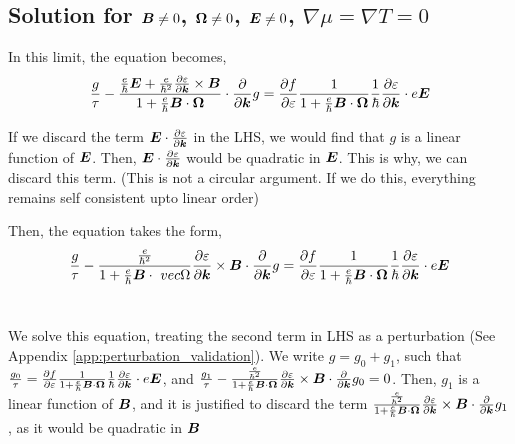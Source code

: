 \documentclass{report}
\renewcommand\vec[1]{\ensuremath\boldsymbol{#1}} %
\begin{document}
\subsection{Solution for $\vec{B}\neq0$, $\vec{\Omega}\neq 0$, $\vec{E} \neq 0$, $\nabla \mu = \nabla T = 0$}

In this limit, the equation becomes,
$$
\frac{g}{\tau} -\frac{\frac{e}{\hbar} \vec{E} +\frac{e}{\hbar^2} \frac{\partial \varepsilon}{\partial \vec{k}} \times \vec{B}}{1 + \frac{e}{\hbar} \vec{B} \cdot \vec{\Omega}} \cdot\frac{\partial}{\partial \vec{k}} g = \frac{\partial f}{\partial \varepsilon}\frac{1}{1 + \frac{e}{\hbar} \vec{B}\cdot \vec{\Omega}}
\frac{1}{\hbar} \frac{\partial \varepsilon}{\partial \vec{k}}\cdot e \vec{E} $$

If we discard the term $\vec{E} \cdot \frac{\partial \varepsilon}{\partial \vec{k}}$ in the LHS, we would find that $g$ is a linear function of $\vec{E}$. Then, $\vec{E} \cdot \frac{\partial \varepsilon}{\partial \vec{k}}$ would be quadratic in $\vec{E}$. This is why, we can discard this term. (This is not a circular argument. If we do this, everything remains self consistent upto linear order)

Then, the equation takes the form,
\begin{equation}
\frac{g}{\tau} -\frac{\frac{e}{\hbar^2} }{1 + \frac{e}{\hbar} \vec{B} \cdot\ vec{\Omega}} \frac{\partial \varepsilon}{\partial \vec{k}} \times \vec{B} \cdot\frac{\partial}{\partial \vec{k}} g = \frac{\partial f}{\partial \varepsilon}\frac{1}{1 + \frac{e}{\hbar} \vec{B}\cdot\vec{\Omega}}
\frac{1}{\hbar} \frac{\partial \varepsilon}{\partial \vec{k}}\cdot e \vec{E}
\end{equation}~\label{Eq:BTE_zero_chem_pot_thermal_gradient}

We solve this equation, treating the second term in LHS as a perturbation (See Appendix \ref{app:perturbation_validation}).
We write $g = g_0 + g_1$, such that $\frac{g_0}{\tau} = \frac{\partial f}{\partial \varepsilon}\frac{1}{1 + \frac{e}{\hbar} \vec{B}\cdot\vec{\Omega}}
\frac{1}{\hbar} \frac{\partial \varepsilon}{\partial \vec{k}}\cdot e \vec{E}$, and $\frac{g_1}{\tau} -\frac{\frac{e}{\hbar^2} }{1 + \frac{e}{\hbar} \vec{B}\cdot\vec{\Omega}} \frac{\partial \varepsilon}{\partial \vec{k}} \times \vec{B} \cdot\frac{\partial}{\partial \vec{k}} g_0 = 0$.
Then, $g_1$ is a linear function of $\vec{B}$, and it is justified to discard the term $\frac{\frac{e}{\hbar^2} }{1 + \frac{e}{\hbar} \vec{B}\cdot\vec{\Omega}} \frac{\partial \varepsilon}{\partial \vec{k}} \times \vec{B} \cdot\frac{\partial}{\partial \vec{k}} g_1$, as it would be quadratic in $\vec{B}$
\end{document}

